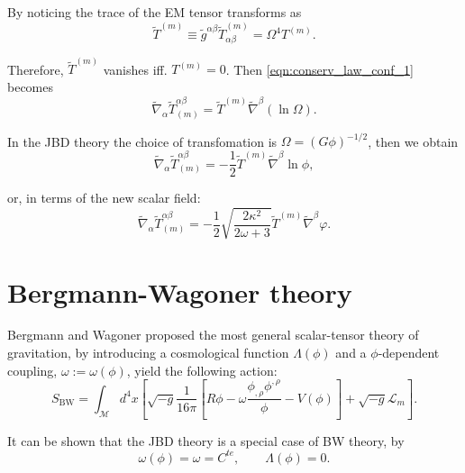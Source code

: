 By noticing the trace of the EM tensor transforms as
\begin{equation}
    \tilde{T}^{(m)} \equiv \tilde{g}^{\alpha\beta} \tilde{T}_{\alpha\beta}^{(m)}=\Omega^{4} T^{(m)} .
\end{equation}

Therefore, $\tilde{T}^{(m)}$ vanishes iff. $T^{(m)}=0$. Then \cref{eqn:conserv_law_conf_1} becomes
\begin{equation}
    \tilde{\nabla}_\alpha \tilde{T}_{(m)}^{\alpha\beta}=\tilde{T}^{(m)}\tilde{\nabla}^\beta(\ln \Omega).
\end{equation}


In the JBD theory the choice of transfomation is $\Omega=(G \phi)^{-1/2}$, then we obtain
\begin{equation}
    \tilde{\nabla}_\alpha \tilde{T}_{(m)}^{\alpha\beta}=-\frac{1}{2} \tilde{T}^{(m)} \tilde{\nabla}^\beta \ln\phi,
\end{equation}


or, in terms of the new scalar field:
\begin{equation}
    \tilde{\nabla}_\alpha \tilde{T}_{(m)}^{\alpha\beta}=-\frac{1}{2}\sqrt{\frac{2\kappa^2}{2\omega+3}} \tilde{T}^{(m)} \tilde{\nabla}^\beta \varphi.
\end{equation}


\section{Bergmann-Wagoner theory}

Bergmann \cite{Bergmann1968} and Wagoner \cite{wagoner1970} proposed the most general scalar-tensor theory of gravitation, by introducing a cosmological function $\Lambda(\phi)$ and a $\phi$-dependent coupling, $\omega:=\omega(\phi)$, yield the following action:
\begin{equation}
    S_{\text{BW}}=\int_{\mathcal{M}} d^4x\left[ \sqrt{-g}\frac{1}{16\pi}\left[R\phi-\omega \frac{\phi_{,\rho}\phi^{,\rho}}{\phi}-V(\phi)\right]+\sqrt{-g}\mathcal{L}_m\right].
    \label{eqn:BD_action_JF}
\end{equation}

It can be shown that the JBD theory is a special case of BW theory, by
\begin{equation}
    \omega(\phi)=\omega=C^{te},\qquad \Lambda(\phi)=0.
\end{equation}

